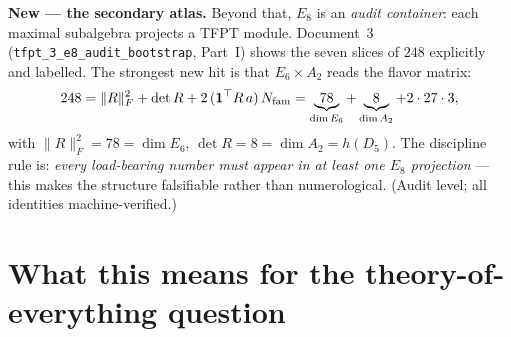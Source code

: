 \noindent\textbf{New --- the secondary atlas.} Beyond that, $E_8$ is an \emph{audit container}: each
maximal subalgebra projects a TFPT module. Document~3 (\texttt{tfpt\_3\_e8\_audit\_bootstrap}, Part~I)
shows the seven slices of $248$ explicitly and labelled. The strongest new hit is that
$E_6\times A_2$ reads the flavor matrix:
\[
  248=\|R\|_F^2+\det R+2\,(\mathbf 1^\top R\,a)\,N_{\mathrm{fam}}=\underbrace{78}_{\dim E_6}+\underbrace{8}_{\dim A_2}+2\cdot27\cdot3 ,
\]
with $\|R\|_F^2=78=\dim E_6$, $\det R=8=\dim A_2=h(D_5)$. The discipline rule is: \emph{every load-bearing
number must appear in at least one $E_8$ projection} --- this makes the structure falsifiable rather than
numerological. (Audit level; all identities machine-verified.)

\section{What this means for the theory-of-everything question}
\needspace{0.46\textheight}
